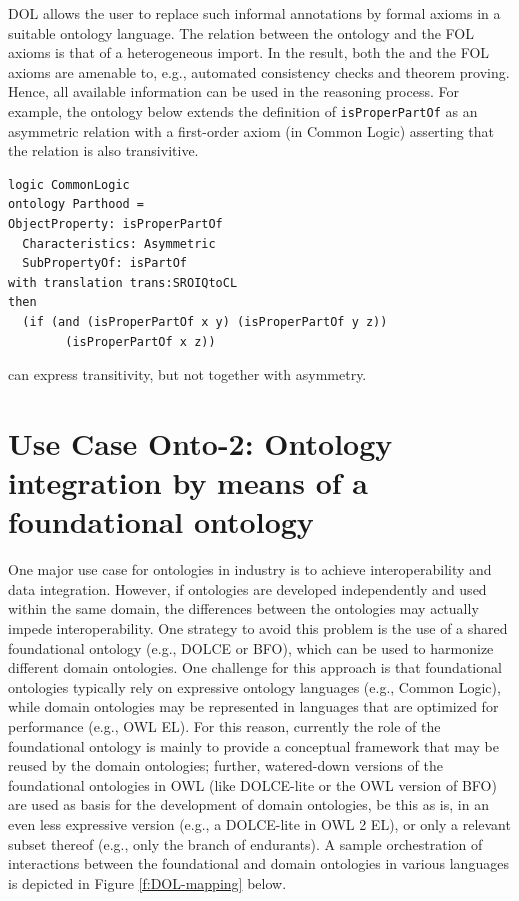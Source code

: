 \documentclass[10pt,fleqn,%
\ifpretendfinal
final%
\else
draft%
\fi,
]{scrreprt}
\begin{document}
DOL allows the user to replace such informal annotations by formal axioms in a suitable ontology 
language. The relation between the \OWL ontology and the FOL axioms is that of a heterogeneous 
import. In the result, both the \OWL and the FOL axioms are amenable to, e.g., automated consistency 
checks and theorem proving. Hence, all available information can be used in the reasoning process.
For example, the ontology below extends the \OWL definition of \texttt{isProperPartOf} as an asymmetric relation
with a first-order axiom (in Common Logic) asserting that the relation is also transivitive.
\begin{lstlisting}[basicstyle=\small\ttfamily,language=dolText,morekeywords={logic,ontology,props,ObjectProperty,Class,DisjointUnionOf,SubClassOf,Characteristics,Transitive,Asymmetric,SubPropertyOf,DisjointClasses,EquivalentTo,inverse,only,forall,iff,if,or,exists},escapechar=@,mathescape]
logic CommonLogic
ontology Parthood =
ObjectProperty: isProperPartOf  
  Characteristics: Asymmetric  
  SubPropertyOf: isPartOf 
with translation trans:SROIQtoCL
then
  (if (and (isProperPartOf x y) (isProperPartOf y z)) 
        (isProperPartOf x z))
\end{lstlisting}
\OWL can express transitivity, but not together with asymmetry.

\section{Use Case Onto-2: Ontology integration by means of a foundational ontology}
One major use case for ontologies in industry is to achieve interoperability and data integration. 
However, if ontologies are developed independently and used  within the same domain, the 
differences between the ontologies may actually impede interoperability. One strategy to avoid this 
problem is the use of a shared  foundational ontology (e.g., DOLCE or BFO), which can be used to 
harmonize different domain ontologies. One challenge for this approach is that foundational 
ontologies typically rely on expressive ontology languages (e.g., Common Logic), while domain 
ontologies may be represented in languages that are optimized for performance (e.g., OWL EL). For 
this reason, currently the role of the foundational ontology is mainly to provide a conceptual 
framework that may be reused by the  domain ontologies; further, watered-down versions of the 
foundational ontologies in OWL (like DOLCE-lite or the OWL version of BFO) are used as basis for 
the  development of domain ontologies, be this as is, in an even less expressive version (e.g., a 
DOLCE-lite in OWL 2 EL), or only a relevant subset thereof (e.g., only the branch of endurants). A 
sample orchestration of interactions between the foundational and domain ontologies in various 
languages is depicted in Figure \ref{f:DOL-mapping} below.
\end{document}
